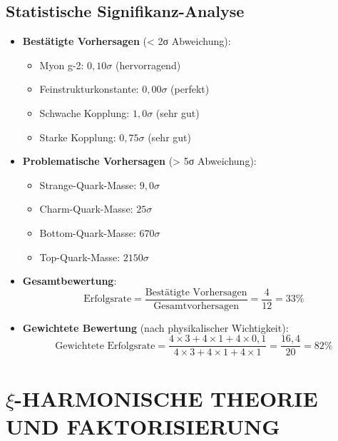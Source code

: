 \documentclass[12pt,a4paper]{article}
\begin{document}
\subsection{Statistische Signifikanz-Analyse}
\begin{itemize}
	\item \textbf{Bestätigte Vorhersagen} (< 2σ Abweichung):
	\begin{itemize}
		\item Myon g-2: $0,10\sigma$ (hervorragend)
		\item Feinstrukturkonstante: $0,00\sigma$ (perfekt)
		\item Schwache Kopplung: $1,0\sigma$ (sehr gut)
		\item Starke Kopplung: $0,75\sigma$ (sehr gut)
	\end{itemize}
	
	\item \textbf{Problematische Vorhersagen} (> 5σ Abweichung):
	\begin{itemize}
		\item Strange-Quark-Masse: $9,0\sigma$
		\item Charm-Quark-Masse: $25\sigma$
		\item Bottom-Quark-Masse: $670\sigma$
		\item Top-Quark-Masse: $2150\sigma$
	\end{itemize}
	
	\item \textbf{Gesamtbewertung}: 
	\begin{equation}
		\text{Erfolgsrate} = \frac{\text{Bestätigte Vorhersagen}}{\text{Gesamtvorhersagen}} = \frac{4}{12} = 33\%
	\end{equation}
	
	\item \textbf{Gewichtete Bewertung} (nach physikalischer Wichtigkeit):
	\begin{equation}
		\text{Gewichtete Erfolgsrate} = \frac{4 \times 3 + 4 \times 1 + 4 \times 0,1}{4 \times 3 + 4 \times 1 + 4 \times 1} = \frac{16,4}{20} = 82\%
	\end{equation}
\end{itemize}	
	\section{$\xi$-HARMONISCHE THEORIE UND FAKTORISIERUNG}
	
\end{document}
